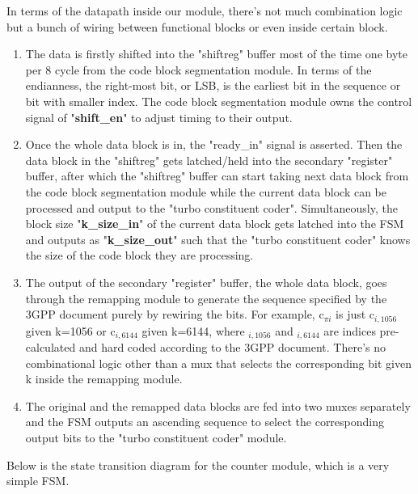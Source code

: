 \documentclass[letterpaper, 12pt]{article} %
\begin{document}
In terms of the datapath inside our module, there's not much combination logic but a bunch of wiring between functional blocks or even inside certain block.

\begin{enumerate}
    \item The data is firstly shifted into the "shiftreg" buffer most of the time one byte per 8 cycle from the code block segmentation module. In terms of the endianness, the right-most bit, or LSB, is the earliest bit in the sequence or bit with smaller index. The code block segmentation module owns the control signal of "{\bf shift\_en}" to adjust timing to their output.
    \item Once the whole data block is in, the "ready\_in" signal is asserted. Then the data block in the "shiftreg" gets latched/held into the secondary "register" buffer, after which the "shiftreg" buffer can start taking next data block from the code block segmentation module while the current data block can be processed and output to the "turbo constituent coder". Simultaneously, the block size "{\bf k\_size\_in}" of the current data block gets latched into the FSM and outputs as "{\bf k\_size\_out}" such that the "turbo constituent coder" knows the size of the code block they are processing.
    \item The output of the secondary "register" buffer, the whole data block, goes through the remapping module to generate the sequence specified by the 3GPP document purely by rewiring the bits. For example, c$_{\pi i}$ is just c$_{i,1056}$ given k=1056 or c$_{i,6144}$ given k=6144, where $_{i,1056}$ and $_{i,6144}$ are indices pre-calculated and hard coded according to the 3GPP document. There's no combinational logic other than a mux that selects the corresponding bit given k inside the remapping module.
    \item The original and the remapped data blocks are fed into two muxes separately and the FSM outputs an ascending sequence to select the corresponding output bits to the "turbo constituent coder" module.
\end{enumerate}

Below is the state transition diagram for the counter module, which is a very simple FSM.\\
\end{document}
